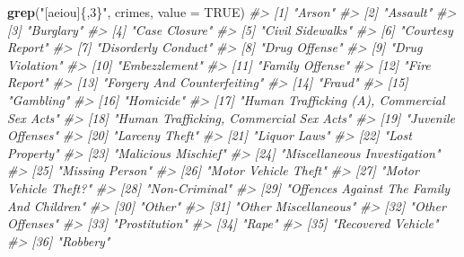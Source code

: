 \documentclass[
  12pt,
]{book}
\newenvironment{Shaded}{\begin{snugshade}}{\end{snugshade}}
\newcommand{\CommentTok}[1]{\textcolor[rgb]{0.37,0.37,0.37}{\textit{#1}}}
\newcommand{\DataTypeTok}[1]{\textcolor[rgb]{0.27,0.27,0.27}{#1}}
\newcommand{\KeywordTok}[1]{\textcolor[rgb]{0.27,0.27,0.27}{\textbf{#1}}}
\newcommand{\NormalTok}[1]{#1}
\newcommand{\OtherTok}[1]{\textcolor[rgb]{0.37,0.37,0.37}{#1}}
\newcommand{\StringTok}[1]{\textcolor[rgb]{0.5,0.5,0.5}{#1}}
\begin{document}
\begin{Shaded}
\begin{Highlighting}[]
\KeywordTok{grep}\NormalTok{(}\StringTok{"[aeiou]\{,3\}"}\NormalTok{, crimes, }\DataTypeTok{value =} \OtherTok{TRUE}\NormalTok{)}
\CommentTok{\#>  [1] "Arson"                                     }
\CommentTok{\#>  [2] "Assault"                                   }
\CommentTok{\#>  [3] "Burglary"                                  }
\CommentTok{\#>  [4] "Case Closure"                              }
\CommentTok{\#>  [5] "Civil Sidewalks"                           }
\CommentTok{\#>  [6] "Courtesy Report"                           }
\CommentTok{\#>  [7] "Disorderly Conduct"                        }
\CommentTok{\#>  [8] "Drug Offense"                              }
\CommentTok{\#>  [9] "Drug Violation"                            }
\CommentTok{\#> [10] "Embezzlement"                              }
\CommentTok{\#> [11] "Family Offense"                            }
\CommentTok{\#> [12] "Fire Report"                               }
\CommentTok{\#> [13] "Forgery And Counterfeiting"                }
\CommentTok{\#> [14] "Fraud"                                     }
\CommentTok{\#> [15] "Gambling"                                  }
\CommentTok{\#> [16] "Homicide"                                  }
\CommentTok{\#> [17] "Human Trafficking (A), Commercial Sex Acts"}
\CommentTok{\#> [18] "Human Trafficking, Commercial Sex Acts"    }
\CommentTok{\#> [19] "Juvenile Offenses"                         }
\CommentTok{\#> [20] "Larceny Theft"                             }
\CommentTok{\#> [21] "Liquor Laws"                               }
\CommentTok{\#> [22] "Lost Property"                             }
\CommentTok{\#> [23] "Malicious Mischief"                        }
\CommentTok{\#> [24] "Miscellaneous Investigation"               }
\CommentTok{\#> [25] "Missing Person"                            }
\CommentTok{\#> [26] "Motor Vehicle Theft"                       }
\CommentTok{\#> [27] "Motor Vehicle Theft?"                      }
\CommentTok{\#> [28] "Non{-}Criminal"                              }
\CommentTok{\#> [29] "Offences Against The Family And Children"  }
\CommentTok{\#> [30] "Other"                                     }
\CommentTok{\#> [31] "Other Miscellaneous"                       }
\CommentTok{\#> [32] "Other Offenses"                            }
\CommentTok{\#> [33] "Prostitution"                              }
\CommentTok{\#> [34] "Rape"                                      }
\CommentTok{\#> [35] "Recovered Vehicle"                         }
\CommentTok{\#> [36] "Robbery"                                   }

\end{Highlighting}
\end{Shaded}
\end{document}
